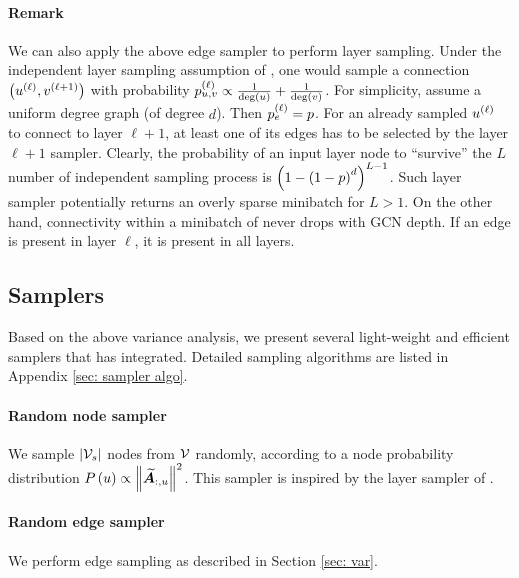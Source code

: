 \paragraph{Remark} We can also apply the above edge sampler to perform layer sampling. Under the independent layer sampling assumption of \cite{fastgcn}, one would sample a connection $\left( u^{\left( \ell \right)},v^{\left( \ell+1 \right)} \right)$ with probability $p_{u,v}^{\left( \ell \right)}\propto \frac{1}{\text{deg}\left( u \right)}+\frac{1}{\text{deg}\left( v \right)}$. 
For simplicity, assume a uniform degree graph (of degree $d$). Then $p_e^{\left( \ell \right)}=p$. For an already sampled $u^{\left( \ell \right)}$ to connect to layer $\ell+1$, at least one of its edges has to be selected by the layer $\ell+1$ sampler. 
Clearly, the probability of an input layer node to ``survive'' the $L$ number of independent sampling process is $\left( 1-\left( 1-p \right)^d \right)^{L-1}$. 
Such layer sampler potentially returns an overly sparse minibatch for $L>1$. On the other hand, connectivity within a minibatch of {\graphsaint} never drops with GCN depth. If an edge is present in layer $\ell$, it is present in all layers. 

\subsection{Samplers}
\label{sec: sampler}

Based on the above variance analysis, we present several light-weight and efficient samplers that {\graphsaint} has integrated. Detailed sampling algorithms are listed in Appendix \ref{sec: sampler algo}.

\paragraph{Random node sampler} 
We sample $\size{\V[s]}$ nodes from $\V$ randomly, according to a node probability distribution $P\paren{u}\propto \norm{\Anorm_{:,u}}^2$. This sampler is inspired by the layer sampler of \cite{fastgcn}.


\paragraph{Random edge sampler} We perform edge sampling as described in Section \ref{sec: var}. 


